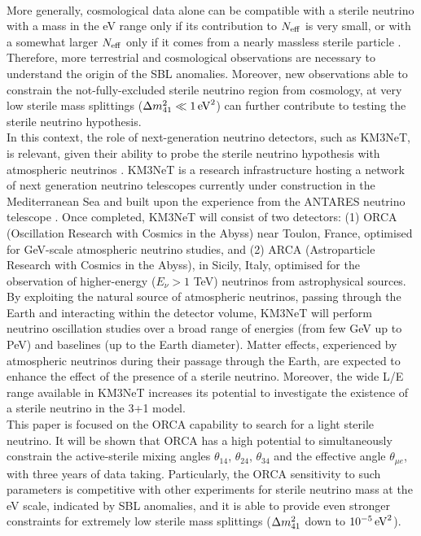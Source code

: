 \\
More generally, cosmological data alone can be compatible with a sterile neutrino with a mass in the eV range only if its contribution to $N_{\rm eff}$ is very small, or with a somewhat larger $N_{\rm eff}$ only if it comes from a nearly massless sterile particle \cite{Planck, Archidiacono_2016}. 
\\
Therefore, more terrestrial and cosmological observations are necessary to understand the origin of the SBL anomalies. Moreover, new observations able to constrain the not-fully-excluded sterile neutrino region from cosmology, at very low sterile mass splittings ($\Delta m^2_{41} \ll 1 \, \rm{eV}^2$) can further contribute to testing the sterile neutrino hypothesis.
\\
In this context, the role of next-generation neutrino detectors, such as KM3NeT, is relevant, given their ability to probe the sterile neutrino hypothesis with atmospheric neutrinos \cite{Razzaque_2011, Razzaque_2012}. KM3NeT is a research infrastructure hosting a network of next generation neutrino telescopes currently under construction in the Mediterranean Sea \cite{loi} and built upon the experience from the ANTARES neutrino telescope \cite{antares_loi}. Once completed, KM3NeT will consist of two detectors: (1) ORCA (Oscillation Research with Cosmics in the Abyss) near Toulon, France, optimised for GeV-scale atmospheric neutrino studies, and (2) ARCA (Astroparticle Research with Cosmics in the Abyss), in Sicily, Italy, optimised for the observation of higher-energy ($E_\nu > 1$ TeV) neutrinos from astrophysical sources. 
\\
By exploiting the natural source of atmospheric neutrinos, passing through the Earth and interacting within the detector volume, KM3NeT will perform neutrino oscillation studies over a broad range of energies (from few GeV up to PeV) and baselines (up to the Earth diameter).
Matter effects, experienced by atmospheric neutrinos during their passage through the Earth, are expected to enhance the effect of the presence of a sterile neutrino. Moreover, the wide L/E range available in KM3NeT increases its potential to investigate the existence of a sterile neutrino in the 3+1 model.
\\
This paper is focused on the ORCA capability to search for a light sterile neutrino. It will be shown that ORCA has a high potential to simultaneously constrain the active-sterile mixing angles $\theta_{14}$, $\theta_{24}$, $\theta_{34}$ and the effective angle $\theta_{\mu e}$, with three years of data taking. Particularly, the ORCA sensitivity to such parameters is competitive with other experiments for sterile neutrino mass at the eV scale, indicated by SBL anomalies, and it is able to provide even stronger constraints for extremely low sterile mass splittings ($\Delta m^2_{41}$ down to $10^{-5} \, \rm{eV}^2$).
